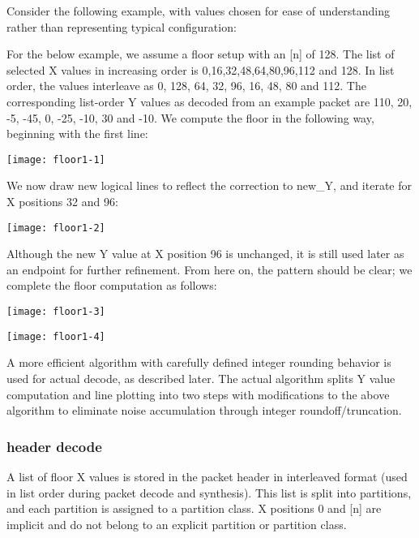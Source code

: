 Consider the following example, with values chosen for ease of
understanding rather than representing typical configuration:

For the below example, we assume a floor setup with an [n] of 128.
The list of selected X values in increasing order is
0,16,32,48,64,80,96,112 and 128.  In list order, the values interleave
as 0, 128, 64, 32, 96, 16, 48, 80 and 112.  The corresponding
list-order Y values as decoded from an example packet are 110, 20, -5,
-45, 0, -25, -10, 30 and -10.  We compute the floor in the following
way, beginning with the first line:

\begin{center}
\texttt{[image: floor1-1]}
\end{center}

We now draw new logical lines to reflect the correction to new_Y, and
iterate for X positions 32 and 96:

\begin{center}
\texttt{[image: floor1-2]}
\end{center}

Although the new Y value at X position 96 is unchanged, it is still
used later as an endpoint for further refinement.  From here on, the
pattern should be clear; we complete the floor computation as follows:

\begin{center}
\texttt{[image: floor1-3]}
\end{center}

\begin{center}
\texttt{[image: floor1-4]}
\end{center}

A more efficient algorithm with carefully defined integer rounding
behavior is used for actual decode, as described later.  The actual
algorithm splits Y value computation and line plotting into two steps
with modifications to the above algorithm to eliminate noise
accumulation through integer roundoff/truncation.



\subsubsection{header decode}

A list of floor X values is stored in the packet header in interleaved
format (used in list order during packet decode and synthesis).  This
list is split into partitions, and each partition is assigned to a
partition class.  X positions 0 and [n] are implicit and do not belong
to an explicit partition or partition class.

